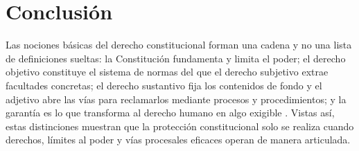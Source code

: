 \documentclass[
  spanish,
  letterpaper, oneside
]{article}
\begin{document}
%
%
%
%
%

\section{Conclusión}

Las nociones básicas del derecho constitucional forman una cadena y no una lista de definiciones sueltas: la Constitución fundamenta y limita el poder; el derecho objetivo constituye el sistema de normas del que el derecho subjetivo extrae facultades concretas; el derecho sustantivo fija los contenidos de fondo y el adjetivo abre las vías para reclamarlos mediante procesos y procedimientos; y la garantía es lo que transforma al derecho humano en algo exigible \citep{cpeum2026,leyAmparo2026}. Vistas así, estas distinciones muestran que la protección constitucional solo se realiza cuando derechos, límites al poder y vías procesales eficaces operan de manera articulada.
\end{document}
